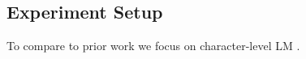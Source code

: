 

\subsection{Experiment Setup}

To compare to prior work we focus on character-level LM \cite[\texttt{text8} and \texttt{enwik8};][]{text8}.

